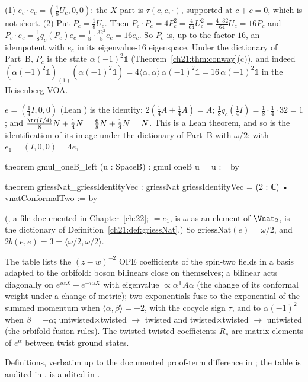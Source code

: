\begin{example}\label{ch21:ex:products}
(1) $e_c\cdot e_c=(\tfrac18U_c,0,0)$: the $X$-part is $\tau(c,c,\cdot)$, supported at $c+c=0$, which is
not short.  (2) Put $P_c=\tfrac18U_c$.  Then $P_c\cdot P_c=4P_c^2=\tfrac4{64}U_c^2=\tfrac{4\cdot32}{64}U_c=16P_c$
and $P_c\cdot e_c=\tfrac18q_c(P_c)e_c=\tfrac18\cdot\tfrac{32^2}8e_c=16e_c$.  So $P_c$ is, up to the factor
$16$, an idempotent with $e_c$ in its eigenvalue-$16$ eigenspace.  Under the dictionary of Part~B, $P_c$
is the state $\alpha(-1)^2\mathbb1$ (Theorem~\ref{ch21:thm:conway}(c)), and indeed
$(\alpha(-1)^2\mathbb1)_{(1)}(\alpha(-1)^2\mathbb1)=4\langle\alpha,\alpha\rangle\,\alpha(-1)^2\mathbb1=16\,\alpha(-1)^2\mathbb1$
in the Heisenberg VOA.
\end{example}

\begin{remark}\label{ch21:rem:unit}
$e=(\tfrac14I,0,0)$ (Lean ) is the identity: $2(\tfrac14A+\tfrac14A)=A$;
$\tfrac18q_c(\tfrac14I)=\tfrac18\cdot\tfrac14\cdot32=1$; and $\tfrac{\tr(I/4)}8N+\tfrac14N=\tfrac68N+\tfrac14N=N$.
This is a Lean theorem, and so is the identification of its image under the dictionary of Part~B with
$\omega/2$: with $e_1=(I,0,0)=4e$,
\begin{leancode}
theorem gmul_oneB_left (u : SpaceB) : gmul oneB u = u := by
\end{leancode}
\begin{leancode}
theorem griessNat_griessIdentityVec :
    griessNat griessIdentityVec = (2 : ℂ) • vnatConformalTwo := by
\end{leancode}
(, a file documented in
Chapter~\ref{ch:22};  $=e_1$,  is $\omega$ as an element of
$\Vnat_2$,  is the dictionary of Definition~\ref{ch21:def:griessNat}.)  So
$\mathrm{griessNat}(e)=\omega/2$, and $2b(e,e)=3=\langle\omega/2,\omega/2\rangle$.
\end{remark}

\begin{physics}
The table lists the $(z-w)^{-2}$ OPE coefficients of the spin-two fields in a basis adapted to the
orbifold: boson bilinears close on themselves; a bilinear acts diagonally on $e^{i\alpha X}+e^{-i\alpha X}$
with eigenvalue $\propto\alpha^{\mathsf T}A\alpha$ (the change of its conformal weight under a change of
metric); two exponentials fuse to the exponential of the summed momentum when
$\langle\alpha,\beta\rangle=-2$, with the cocycle sign $\tau$, and to $\alpha(-1)^2$ when $\beta=-\alpha$;
untwisted$\times$twisted $\to$ twisted and twisted$\times$twisted $\to$ untwisted (the orbifold fusion
rules).  The twisted-twisted coefficients $R_c$ are matrix elements of $e^{\alpha}$ between twist ground
states.
\end{physics}
\begin{status}
Definitions, verbatim up to the documented proof-term difference in ; the table is audited
in .   is audited in
.
\end{status}

